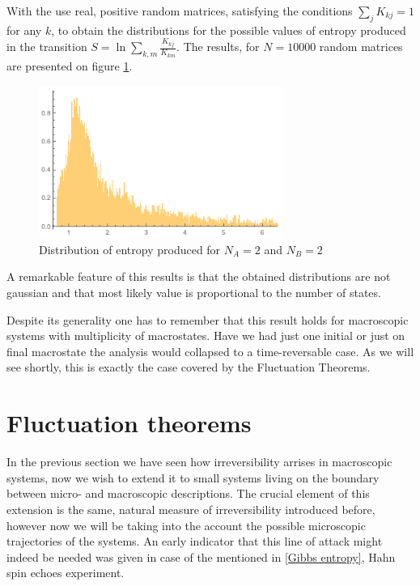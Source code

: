 \documentclass[a4paper,12pt]{article}
\begin{document}
With the use real, positive random matrices, satisfying the conditions $\sum_j K_{kj} = 1$ for any $k$, to obtain the distributions for the possible values of entropy produced in the transition $ S = \ln{\sum_{k,m} \frac{K_{kj}}{K_{km}}} $. The results, for $N=10000$ random matrices are presented on figure \ref{Fig4}.

\begin{figure}[ht!]
\centering \includegraphics[width=8cm]{dissipation} \caption{Distribution of entropy produced for $N_A = 2$ and $N_B=2$}
\label{Fig4} 
\end{figure}

A remarkable feature of this results is that the obtained distributions are not gaussian and that most likely value is proportional to the number of states. 

Despite its generality one has to remember that this result holds for macroscopic systems with multiplicity of macrostates. Have we had just one initial or just on final macrostate the analysis would collapsed to a time-reversable case. As we will see shortly, this is exactly the case covered by the Fluctuation Theorems.

\section{Fluctuation theorems}

In the previous section we have seen how irreversibility arrises in macroscopic systems, now we wish to extend it to small systems living on the boundary between micro- and macroscopic descriptions. The crucial element of this extension is the same, natural measure of irreversibility introduced before, however now we will be taking into the account the possible microscopic trajectories of the systems. 
An early indicator that this line of attack might indeed be needed was given in case of the mentioned in \ref{Gibbs entropy}, Hahn spin echoes experiment.
\end{document}
